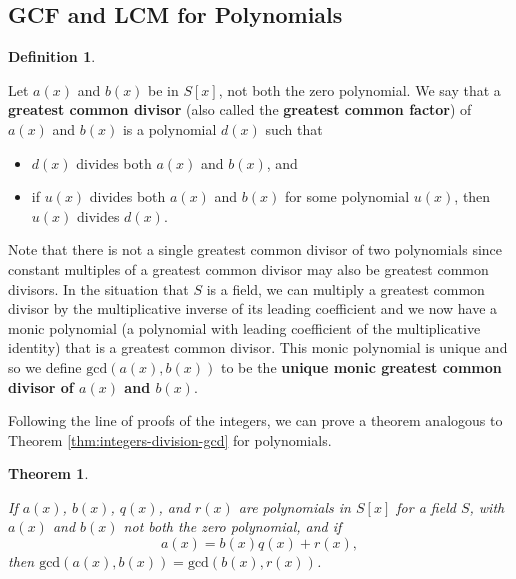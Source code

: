 \documentclass[
]{book}
\providecommand{\tightlist}{%
  \setlength{\itemsep}{0pt}\setlength{\parskip}{0pt}}
\newtheorem{theorem}{Theorem}[chapter]
\theoremstyle{definition}
\newtheorem{definition}{Definition}[chapter]
\theoremstyle{definition}
\theoremstyle{definition}
\theoremstyle{definition}
\theoremstyle{remark}
\begin{document}
\hypertarget{gcf-and-lcm-for-polynomials}{%
\subsection{GCF and LCM for Polynomials}\label{gcf-and-lcm-for-polynomials}}

\begin{definition}
\protect\hypertarget{def:unlabeled-div-125}{}\label{def:unlabeled-div-125}

Let \(a(x)\) and \(b(x)\) be in \(S[x]\), not both the zero polynomial. We say that a \textbf{greatest common divisor} (also called the \textbf{greatest common factor}) of \(a(x)\) and \(b(x)\) is a polynomial \(d(x)\) such that

\begin{itemize}
\tightlist
\item
  \(d(x)\) divides both \(a(x)\) and \(b(x)\), and
\item
  if \(u(x)\) divides both \(a(x)\) and \(b(x)\) for some polynomial \(u(x)\), then \(u(x)\) divides \(d(x)\).
\end{itemize}

\end{definition}

Note that there is not a single greatest common divisor of two polynomials since constant multiples of a greatest common divisor may also be greatest common divisors. In the situation that \(S\) is a field, we can multiply a greatest common divisor by the multiplicative inverse of its leading coefficient and we now have a monic polynomial (a polynomial with leading coefficient of the multiplicative identity) that is a greatest common divisor. This monic polynomial is unique and so we define \(\mathrm{gcd}(a(x),b(x))\) to be the \textbf{unique monic greatest common divisor of \(a(x)\) and \(b(x)\)}.

Following the line of proofs of the integers, we can prove a theorem analogous to Theorem \ref{thm:integers-division-gcd} for polynomials.

\begin{theorem}
\protect\hypertarget{thm:polynomial-division-gcd}{}\label{thm:polynomial-division-gcd}

If \(a(x)\), \(b(x)\), \(q(x)\), and \(r(x)\) are polynomials in \(S[x]\) for a field \(S\), with \(a(x)\) and \(b(x)\) not both the zero polynomial, and if \[a(x)=b(x)q(x)+r(x),\] then \(\mathrm{gcd}(a(x),b(x))=\mathrm{gcd}(b(x),r(x))\).

\end{theorem}
\end{document}
